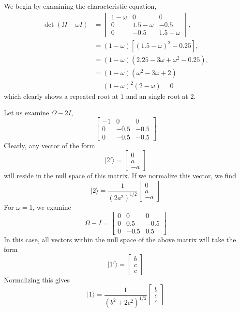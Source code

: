 \documentclass[../principles-of-quantum-mechanics.tex]{subfiles}
\begin{document}
\begin{questions}
\begin{solution}
	We begin by examining the characteristic equation,
	\begin{align*}
		\det(\Omega-\omega{I}) &= \begin{vmatrix}1 - \omega & 0 & 0 \\ 0 & 1.5 - \omega & -0.5 \\ 0 & -0.5 & 1.5 - \omega\end{vmatrix}, \\
		&= (1-\omega)[(1.5-\omega)^2 - 0.25], \\
		&= (1 - \omega)(2.25 - 3\omega + \omega^2 - 0.25), \\
		&= (1 - \omega)(\omega^2 - 3\omega + 2) \\
		&= (1 - \omega)^2(2 - \omega) = 0
	\end{align*}
	which clearly shows a repeated root at $1$ and an single root at $2$.
	
	Let us examine $\Omega - 2{I}$,
	\[
		\begin{bmatrix}
			-1 & 0 & 0 \\ 0 & -0.5 & -0.5 \\ 0 & -0.5 & -0.5
		\end{bmatrix}
	\]
	Clearly, any vector of the form
	\[
		|2'\rangle = \begin{bmatrix}0 \\ a \\ -a\end{bmatrix}
	\]
	will reside in the null space of this matrix. If we normalize this vector, we find
	\[
		|2\rangle = \frac{1}{(2a^2)^{1/2}}\begin{bmatrix}0 \\ a \\ -a\end{bmatrix}
	\]
	For $\omega = 1$, we examine
	\[
		\Omega - I = \begin{bmatrix} 0 & 0 & 0 \\ 0 & 0.5 & -0.5 \\ 0 & -0.5 & 0.5 \end{bmatrix}
	\]
	In this case, all vectors within the null space of the above matrix will take the form
	\[
		|1'\rangle = \begin{bmatrix}b \\ c \\ c\end{bmatrix}
	\]
	Normalizing this gives
	\[
		|1\rangle = \frac{1}{(b^2 + 2c^2)^{1/2}}\begin{bmatrix}b \\ c \\ c\end{bmatrix}
	\]
\end{solution}


\end{questions}
\end{document}

